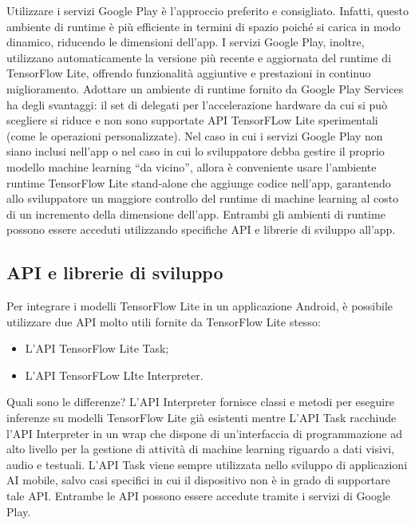 Utilizzare i servizi Google Play è l’approccio preferito e consigliato. Infatti, questo ambiente di runtime è più efficiente in termini di spazio poiché si carica in modo dinamico, riducendo le dimensioni dell’app.
I servizi Google Play, inoltre, utilizzano automaticamente la versione più recente e aggiornata del runtime di TensorFlow Lite, offrendo funzionalità aggiuntive e prestazioni in continuo miglioramento. 
Adottare un ambiente di runtime fornito da Google Play Services ha degli svantaggi: il set di delegati per l’accelerazione hardware da cui si può scegliere si riduce e non sono supportate API TensorFLow Lite sperimentali
(come le operazioni personalizzate). Nel caso in cui i servizi Google Play non siano inclusi nell’app o nel caso in cui lo sviluppatore debba gestire il proprio modello machine learning “da vicino”, allora è conveniente usare
l’ambiente runtime TensorFlow Lite stand-alone che aggiunge codice nell’app, garantendo allo sviluppatore un maggiore controllo del runtime di machine learning al costo di un incremento della dimensione dell’app. 
Entrambi gli ambienti di runtime possono essere acceduti utilizzando specifiche API e librerie di sviluppo all’app.

\subsection{API e librerie di sviluppo}
Per integrare i modelli TensorFlow Lite in un applicazione Android, è possibile utilizzare due API molto utili fornite da TensorFlow Lite stesso:
\begin{itemize}
    \item L’API TensorFlow Lite Task;
    \item L’API TensorFLow LIte Interpreter.
\end{itemize}

Quali sono le differenze? L’API Interpreter fornisce classi e metodi per eseguire inferenze su modelli TensorFlow Lite già esistenti mentre L’API Task racchiude l’API Interpreter in un wrap che dispone di un’interfaccia
di programmazione ad alto livello per la gestione di attività di machine learning riguardo a dati visivi, audio e testuali. L’API Task viene sempre utilizzata nello sviluppo di applicazioni AI mobile, salvo casi specifici
in cui il dispositivo non è in grado di supportare tale API. Entrambe le API possono essere accedute tramite i servizi di Google Play.

